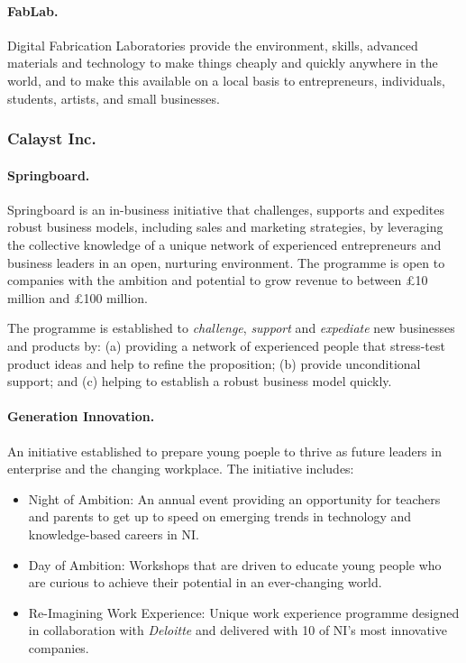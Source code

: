 \paragraph{FabLab.} Digital Fabrication Laboratories provide the environment, skills, advanced materials and technology to make things cheaply and quickly anywhere in the world, and to make this available on a local basis to entrepreneurs, individuals, students, artists, and small businesses.

\subsubsection{Calayst Inc.}

\paragraph{Springboard.} Springboard is an in-business initiative that challenges, supports and expedites robust business models, including sales and marketing strategies, by leveraging the collective knowledge of a unique network of experienced entrepreneurs and business leaders in an open, nurturing environment. The programme is open to companies with the ambition and potential to grow revenue to between \pounds 10 million and \pounds 100 million.

The programme is established to \emph{challenge}, \emph{support} and \emph{expediate} new businesses and products by: (a) providing a network of experienced people that stress-test product ideas and help to refine the proposition; (b) provide unconditional support; and (c) helping to establish a robust business model quickly.

\paragraph{Generation Innovation.} An initiative established to prepare young poeple to thrive as future leaders in enterprise and the changing workplace. The initiative includes:
\begin{itemize}
    \item Night of Ambition: An annual event providing an opportunity for teachers and parents to get up to speed on emerging trends in technology and knowledge-based careers in NI.
    \item Day of Ambition: Workshops that are driven to educate young people who are curious to achieve their potential in an ever-changing world.
    \item Re-Imagining Work Experience: Unique work experience programme designed in collaboration with \emph{Deloitte} and delivered with 10 of NI's most innovative companies.
\end{itemize}

